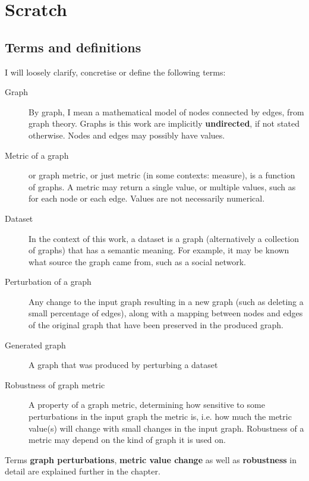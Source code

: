 \setcounter{chapter}{-1}
\chapter{Scratch}

\section{Terms and definitions}

    I will loosely clarify, concretise or define the following terms:

    \begin{description}
        \item[Graph]
        By graph, I mean a mathematical model of nodes connected by edges, from graph theory. Graphs is this work are implicitly \textbf{undirected}, if not stated otherwise. Nodes and edges may possibly have values.
        
        \item[Metric of a graph]
        or graph metric, or just metric (in some contexts: measure), is a function of graphs. A metric may return a single value, or multiple values, such as for each node or each edge. Values are not necessarily numerical.
        
        \item [Dataset]
        In the context of this work, a dataset is a graph (alternatively a collection of graphs) that has a semantic meaning. For example, it may be known what source the graph came from, such as a social network.
    
        \item[Perturbation of a graph]
        Any change to the input graph resulting in a new graph (such as deleting a small percentage of edges), along with a mapping between nodes and edges of the original graph that have been preserved in the produced graph.
        
        \item[Generated graph]
        A graph that was produced by perturbing a dataset
    
        \item[Robustness of graph metric]
        A property of a graph metric, determining how sensitive to some perturbations in the input graph the metric is, i.e. how much the metric value(s) will change with small changes in the input graph. Robustness of a metric may depend on the kind of graph it is used on.
    \end{description}
    
    Terms \textbf{graph perturbations}, \textbf{metric value change} as well as \textbf{robustness} in detail are explained further in the  chapter.
